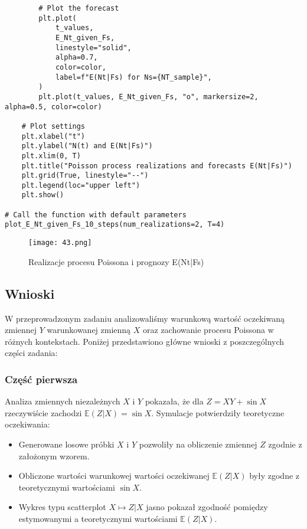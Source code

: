 \documentclass[12pt,letterpaper]{article}
\theoremstyle{definition}
\begin{document}
\begin{lstlisting}
        # Plot the forecast
        plt.plot(
            t_values,
            E_Nt_given_Fs,
            linestyle="solid",
            alpha=0.7,
            color=color,
            label=f"E(Nt|Fs) for Ns={NT_sample}",
        )
        plt.plot(t_values, E_Nt_given_Fs, "o", markersize=2, alpha=0.5, color=color)

    # Plot settings
    plt.xlabel("t")
    plt.ylabel("N(t) and E(Nt|Fs)")
    plt.xlim(0, T)
    plt.title("Poisson process realizations and forecasts E(Nt|Fs)")
    plt.grid(True, linestyle="--")
    plt.legend(loc="upper left")
    plt.show()

# Call the function with default parameters
plot_E_Nt_given_Fs_10_steps(num_realizations=2, T=4)
\end{lstlisting}

\begin{figure}[H]
    \centering
    \texttt{[image: 43.png]} 


    \caption{Realizacje procesu Poissona i prognozy E(Nt|Fs)}

\end{figure}
\subsection{Wnioski}

W przeprowadzonym zadaniu analizowaliśmy warunkową wartość oczekiwaną zmiennej \( Y \) warunkowanej zmienną \( X \) oraz zachowanie procesu Poissona w różnych kontekstach. Poniżej przedstawiono główne wnioski z poszczególnych części zadania:

\subsubsection{Część pierwsza}

Analiza zmiennych niezależnych \( X \) i \( Y \) pokazała, że dla \( Z = XY + \sin X \) rzeczywiście zachodzi \( \mathbb{E}(Z | X) = \sin X \). Symulacje potwierdziły teoretyczne oczekiwania:
\begin{itemize}
    \item Generowane losowe próbki \( X \) i \( Y \) pozwoliły na obliczenie zmiennej \( Z \) zgodnie z założonym wzorem.
    \item Obliczone wartości warunkowej wartości oczekiwanej \( \mathbb{E}(Z | X) \) były zgodne z teoretycznymi wartościami \( \sin X \).
    \item Wykres typu scatterplot \( X \mapsto Z|X \) jasno pokazał zgodność pomiędzy estymowanymi a teoretycznymi wartościami \( \mathbb{E}(Z | X) \).
\end{itemize}
\end{document}

